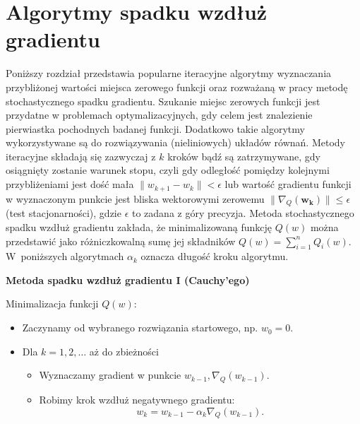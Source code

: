 \newpage
\section{Algorytmy spadku wzdłuż gradientu}\label{R-N}

Poniższy rozdział przedstawia popularne iteracyjne algorytmy wyznaczania przybliżonej wartości miejsca zerowego funkcji oraz rozważaną w pracy metodę stochastycznego spadku gradientu. Szukanie miejsc zerowych funkcji jest przydatne w problemach optymalizacyjnych, gdy celem jest znalezienie pierwiastka pochodnych badanej funkcji. Dodatkowo takie algorytmy wykorzystywane są do rozwiązywania (nieliniowych) układów równań. Metody iteracyjne składają się zazwyczaj z $k$ kroków bądź są zatrzymywane, gdy osiągnięty zostanie warunek stopu, czyli gdy odległość pomiędzy kolejnymi przybliżeniami jest dość mała $\parallel w_{k+1}-w_k\parallel < \epsilon$ lub wartość gradientu funkcji w wyznaczonym punkcie jest bliska wektorowymi zerowemu $\parallel \nabla_Q(\mathbf{w_k}) \parallel \leqslant \epsilon$ (test stacjonarności), gdzie $\epsilon$ to zadana z góry precyzja.
Metoda stochastycznego spadku wzdłuż gradientu zakłada, że minimalizowaną funkcję $Q(w)$ można przedstawić jako różniczkowalną sumę jej składników $Q(w) = \sum_{i=1}^{n}Q_i(w)$. W~poniższych algorytmach $\alpha_k$ oznacza długość kroku algorytmu.
\begin{center}
\textbf{Metoda spadku wzdłuż gradientu I (Cauchy’ego)}
\end{center}
Minimalizacja funkcji $Q(w)$:
\begin{itemize}
\item Zaczynamy od wybranego rozwiązania startowego, np. $w_{0} = 0$.
\item Dla $k = 1, 2, \dots$ aż do zbieżności
	\begin{itemize}
	\item Wyznaczamy gradient w punkcie $w_{k-1}, \nabla_{Q}(w_{k-1})$.
	\item Robimy krok wzdłuż negatywnego gradientu: $$w_{k} = w_{k-1} - \alpha_{k}\nabla_{Q}(w_{k-1}). $$
	\end{itemize}
\end{itemize}

